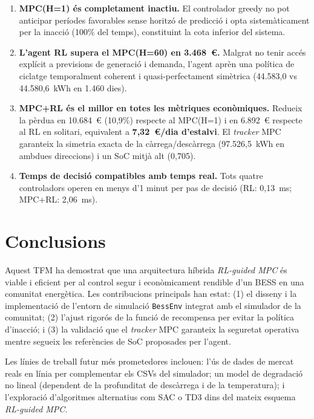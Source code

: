 \documentclass[a4paper,12pt]{ThesisStyle}
\begin{document}
\begin{enumerate}
  \item \textbf{MPC(H=1) és completament inactiu.} El controlador greedy no pot anticipar
        períodes favorables sense horitzó de predicció i opta sistemàticament per la inacció
        (100\% del temps), constituint la cota inferior del sistema.

  \item \textbf{L'agent RL supera el MPC(H=60) en 3.468~€.} Malgrat no tenir accés explícit
        a previsions de generació i demanda, l'agent aprèn una política de ciclatge
        temporalment coherent i quasi-perfectament simètrica (44.583,0 vs 44.580,6~kWh en
        1.460 dies).

  \item \textbf{MPC+RL és el millor en totes les mètriques econòmiques.} Redueix la pèrdua
        en 10.684~€ (10,9\%) respecte al MPC(H=1) i en 6.892~€ respecte al RL en solitari,
        equivalent a \textbf{7,32~€/dia d'estalvi}. El \textit{tracker} MPC garanteix la simetria
        exacta de la càrrega/descàrrega (97.526,5~kWh en ambdues direccions) i un SoC mitjà
        alt (0,705).

  \item \textbf{Temps de decisió compatibles amb temps real.} Tots quatre controladors
        operen en menys d'1 minut per pas de decisió (RL: 0,13~ms; MPC+RL: 2,06~ms).
\end{enumerate}

\section*{Conclusions}

Aquest TFM ha demostrat que una arquitectura híbrida \textit{RL-guided MPC} és viable i eficient per al
control segur i econòmicament rendible d'un BESS en una comunitat energètica. Les contribucions
principals han estat: (1) el disseny i la implementació de l'entorn de simulació \texttt{BessEnv}
integrat amb el simulador de la comunitat; (2) l'ajust rigorós de la funció de recompensa per
evitar la política d'inacció; i (3) la validació que el \textit{tracker} MPC garanteix la
seguretat operativa mentre segueix les referències de SoC proposades per l'agent.

Les línies de treball futur més prometedores inclouen: l'ús de dades de mercat reals en línia per
complementar els CSVs del simulador; un model de degradació no lineal (dependent de la profunditat
de descàrrega i de la temperatura); i l'exploració d'algoritmes alternatius com SAC o TD3 dins
del mateix esquema \textit{RL-guided MPC}.
\end{document}
